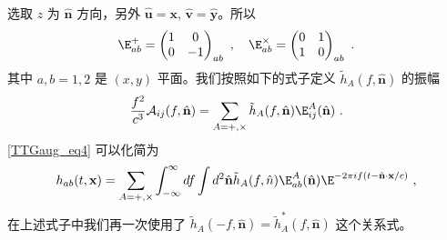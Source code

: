 选取 $z$ 为 $\hat{ \mathbf n }$ 方向，另外 $\hat{ \mathbf u }=\mathbf x$, $\hat{ \mathbf v } = \hat{ \mathbf y }$。所以
\begin{equation}
\E^+_{ab} = \begin{pmatrix}
1 & 0 \\
0 & -1 
\end{pmatrix}_{ab}~, \quad \E^\times_{ab} = \begin{pmatrix}
0 & 1 \\
1 & 0 
\end{pmatrix}_{ab}~.
\end{equation}
其中 $a,b = 1,2$ 是 $(x,y)$ 平面。我们按照如下的式子定义 $\tilde h_A(f,\hat{ {\mathbf n} })$ 的振幅
\begin{equation}
\frac{f^2}{c^3} \mathcal A_{ij} (f,\hat{ \mathbf n }) = \sum_{A = +,\times} \tilde h_{A} (f, \hat{  {\mathbf n} } ) \E^A_{ij} (\hat{ {\mathbf n} } )~.
\end{equation}
\autoref{TTGaug_eq4} 可以化简为
\begin{equation}
h_{ab}(t,\mathbf x) = \sum_{A = +,\times} \int_{-\infty}^{\infty} df \int d^2 \hat{\mathbf n } \tilde h_A (f, \hat{ n }  ) \E^A_{ab} ( \hat{ \mathbf n } ) \E^{-2 \pi i f (t - \hat{ \mathbf n }\cdot {\mathbf x}/c )}~,
\end{equation}
在上述式子中我们再一次使用了 $\tilde h_A (-f, \hat{ \mathbf n } ) = \tilde h_A^* (f, \hat{ \mathbf n }) $ 这个关系式。






 


 


















